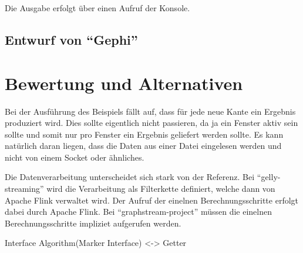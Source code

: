 Die Ausgabe erfolgt über einen Aufruf der Konsole.

\subsection{Entwurf von \enquote{Gephi}}

\section{Bewertung und Alternativen}

Bei der Ausführung des Beispiels fällt auf, dass für jede neue Kante ein
Ergebnis produziert wird. Dies sollte eigentlich nicht passieren, da ja ein
Fenster aktiv sein sollte und somit nur pro Fenster ein Ergebnis geliefert
werden sollte. Es kann natürlich daran liegen, dass die Daten aus einer Datei
eingelesen werden und nicht von einem Socket oder ähnliches.

Die Datenverarbeitung unterscheidet sich stark von der Referenz.
Bei \enquote{gelly-streaming} wird die Verarbeitung als Filterkette definiert,
welche dann von Apache Flink verwaltet wird. Der Aufruf der einelnen
Berechnungsschritte erfolgt dabei durch Apache Flink. Bei
\enquote{graphstream-project} müssen die einelnen Berechnungsschritte impliziet
aufgerufen werden. 

Interface Algorithm(Marker Interface) <-> Getter

